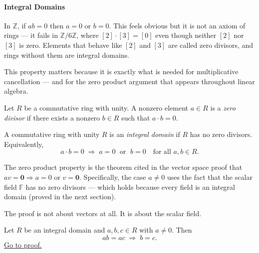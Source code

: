 \paragraph{Integral Domains}

\begin{remark}[Motivation]
In $\mathbb{Z}$, if $ab = 0$ then $a = 0$ or $b = 0$.
This feels obvious but it is not an axiom of rings --- it fails in
$\mathbb{Z}/6\mathbb{Z}$, where $[2] \cdot [3] = [0]$ even though
neither $[2]$ nor $[3]$ is zero. Elements that behave like $[2]$
and $[3]$ are called zero divisors, and rings without them are
integral domains.

This property matters because it is exactly what is needed for
multiplicative cancellation --- and for the zero product argument
that appears throughout linear algebra.
\end{remark}

\begin{definition}
\label{def:notes-rings-integral-domains-l19}
Let $R$ be a commutative ring with unity.
A nonzero element $a \in R$ is a \emph{zero divisor} if there exists
a nonzero $b \in R$ such that $a \cdot b = 0$.
\end{definition}

\begin{definition}
\label{def:notes-rings-integral-domains-l25}
A commutative ring with unity $R$ is an \emph{integral domain} if
$R$ has no zero divisors. Equivalently,
\[
a \cdot b = 0 \;\Longrightarrow\; a = 0 \;\text{ or }\; b = 0
\quad \text{for all } a, b \in R.
\]
\end{definition}

\begin{remark}
The zero product property is the theorem cited in the vector space proof
that $av = \mathbf{0} \Rightarrow a = 0$ or $v = \mathbf{0}$.
Specifically, the case $a \neq 0$ uses the fact that the scalar field
$\mathbb{F}$ has no zero divisors --- which holds because every field
is an integral domain (proved in the next section).

The proof is not about vectors at all. It is about the scalar field.
\end{remark}

\begin{proposition}
\label{prop:domain-cancellation}
Let $R$ be an integral domain and $a, b, c \in R$ with $a \neq 0$.
Then
\[
ab = ac \;\Longrightarrow\; b = c.
\]
\hyperref[prf:domain-cancellation]{Go to proof.}
\end{proposition}

